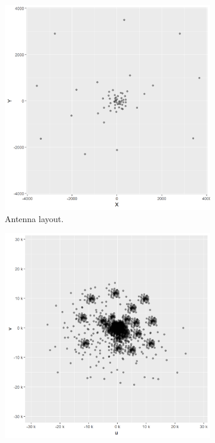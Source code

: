 \begin{figure}[!h]
	\centering
	\begin{subfigure}[b]{0.4\linewidth}
		\includegraphics[width=\linewidth]{./chapters/01.intro/aperture/ants.png}
		\caption{Antenna layout.}
		\label{radio:sampling:ants}
	\end{subfigure}
	\begin{subfigure}[b]{0.4\linewidth}
		\includegraphics[width=\linewidth]{./chapters/01.intro/aperture/snapshot.png}

\end{subfigure}
\end{figure}
